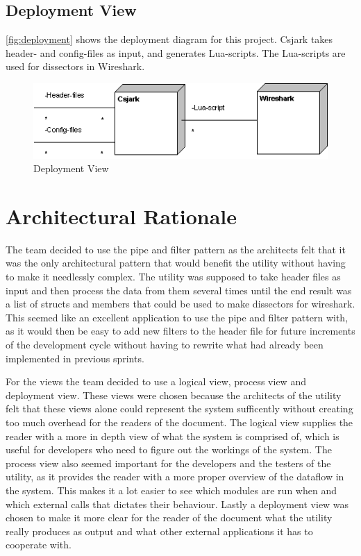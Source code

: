 \subsection{Deployment View}
\autoref{fig:deployment} shows the deployment diagram for this project. Csjark takes header- and config-files as input, and generates Lua-scripts. The Lua-scripts are used for dissectors in Wireshark.

\begin{figure}[htb]
	\includegraphics[width = \textwidth]{./planning/img/Deployment}
	\caption{Deployment View\label{fig:deployment}}
\end{figure}


\section{Architectural Rationale}
The team decided to use the pipe and filter pattern as the architects felt that it was the only architectural pattern that would benefit the utility without having to make it needlessly complex. The utility was supposed to take header files as input and then process the data from them several times until the end result was a list of structs and members that could be used to make dissectors for wireshark. This seemed like an excellent application to use the pipe and filter pattern with, as it would then be easy to add new filters to the header file for future increments of the development cycle without having to rewrite what had already been implemented in previous sprints.

For the views the team decided to use a logical view, process view and deployment view. These views were chosen because the architects of the utility felt that these views alone could represent the system sufficently without creating too much overhead for the readers of the document. The logical view supplies the reader with a more in depth view of what the system is comprised of, which is useful for developers who need to figure out the workings of the system. The process view also seemed important for the developers and the testers of the utility, as it provides the reader with a more proper overview of the dataflow in the system. This makes it a lot easier to see which modules are run when and which external calls that dictates their behaviour. Lastly a deployment view was chosen to make it more clear for the reader of the document what the utility really produces as output and what other external applications it has to cooperate with. 

